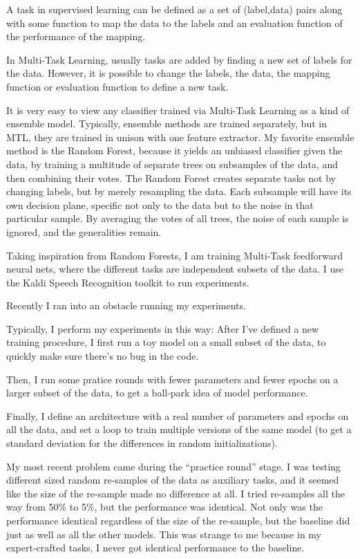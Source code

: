 \documentclass[12pt,a4paper]{article}
\begin{document}
A task in supervised learning can be defined as a set of (label,data) pairs along with some function to map the data to the labels and an evaluation function of the performance of the mapping.

In Multi-Task Learning, usually tasks are added by finding a new set of labels for the data. However, it is possible to change the labels, the data, the mapping function or evaluation function to define a new task.

It is very easy to view any classifier trained via Multi-Task Learning as a kind of ensemble model. Typically, ensemble methods are trained separately, but in MTL, they are trained in unison with one feature extractor. My favorite ensemble method is the Random Forest, because it yields an unbiased classifier given the data, by training a multitude of separate trees on subsamples of the data, and then combining their votes. The Random Forest creates separate tasks not by changing labels, but by merely resampling the data. Each subsample will have its own decision plane, specific not only to the data but to the noise in that particular sample. By averaging the votes of all trees, the noise of each sample is ignored, and the generalities remain.

Taking inspiration from Random Forests, I am training Multi-Task feedforward neural nets, where the different tasks are independent subsets of the data. I use the Kaldi Speech Recognition toolkit to run experiments.

Recently I ran into an obstacle running my experiments.

Typically, I perform my experiments in this way: After I've defined a new training procedure, I first run a toy model on a small subset of the data, to quickly make sure there's no bug in the code.

Then, I run some pratice rounds with fewer parameters and fewer epochs on a larger subset of the data, to get a ball-park idea of model performance.

Finally, I define an architecture with a real number of parameters and epochs on all the data, and set a loop to train multiple versions of the same model (to get a standard deviation for the differences in random initializations).

My most recent problem came during the ``practice round'' stage. I was testing different sized random re-samples of the data as auxiliary tasks, and it seemed like the size of the re-sample made no difference at all. I tried re-samples all the way from 50\% to 5\%, but the performance was identical. Not only was the performance identical regardless of the size of the re-sample, but the baseline did just as well as all the other models. This was strange to me because in my expert-crafted tasks, I never got identical performance to the baseline.
\end{document}
